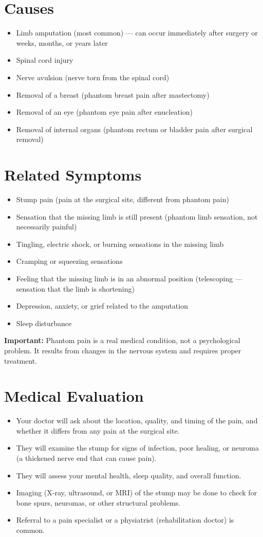 \section*{Causes}
\begin{itemize}
  \item Limb amputation (most common) — can occur immediately after surgery or weeks, months, or years later
  \item Spinal cord injury
  \item Nerve avulsion (nerve torn from the spinal cord)
  \item Removal of a breast (phantom breast pain after mastectomy)
  \item Removal of an eye (phantom eye pain after enucleation)
  \item Removal of internal organs (phantom rectum or bladder pain after surgical removal)
\end{itemize}

\section*{Related Symptoms}
\begin{itemize}
  \item Stump pain (pain at the surgical site, different from phantom pain)
  \item Sensation that the missing limb is still present (phantom limb sensation, not necessarily painful)
  \item Tingling, electric shock, or burning sensations in the missing limb
  \item Cramping or squeezing sensations
  \item Feeling that the missing limb is in an abnormal position (telescoping — sensation that the limb is shortening)
  \item Depression, anxiety, or grief related to the amputation
  \item Sleep disturbance
\end{itemize}
\textbf{Important:} Phantom pain is a real medical condition, not a psychological problem. It results from changes in the nervous system and requires proper treatment.

\section*{Medical Evaluation}
\begin{itemize}
  \item Your doctor will ask about the location, quality, and timing of the pain, and whether it differs from any pain at the surgical site.
  \item They will examine the stump for signs of infection, poor healing, or neuroma (a thickened nerve end that can cause pain).
  \item They will assess your mental health, sleep quality, and overall function.
  \item Imaging (X-ray, ultrasound, or MRI) of the stump may be done to check for bone spurs, neuromas, or other structural problems.
  \item Referral to a pain specialist or a physiatrist (rehabilitation doctor) is common.
\end{itemize}

